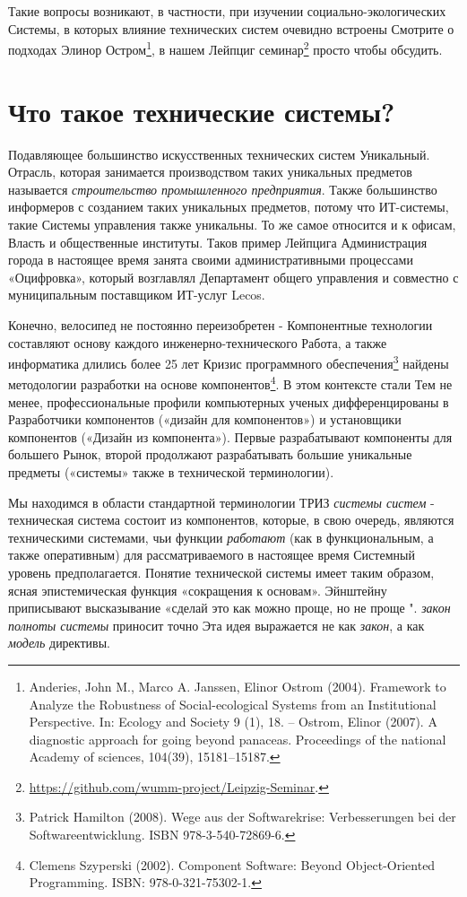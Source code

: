 \documentclass[11pt,a4paper]{article}
\begin{document}
Такие вопросы возникают, в частности, при изучении социально-экологических
Системы, в которых влияние технических систем очевидно встроены Смотрите о
подходах Элинор Остром\footnote{Anderies, John M., Marco A. Janssen, Elinor
  Ostrom (2004).  Framework to Analyze the Robustness of Social-ecological
  Systems from an Institutional Perspective. In: Ecology and Society 9 (1),
  18. -- Ostrom, Elinor (2007). A diagnostic approach for going beyond
  panaceas.  Proceedings of the national Academy of sciences, 104(39),
  15181--15187.}, в нашем Лейпциг
семинар\footnote{\url{https://github.com/wumm-project/Leipzig-Seminar}.}
просто чтобы обсудить.

\section{Что такое технические системы?}

Подавляющее большинство искусственных технических систем Уникальный. Отрасль,
которая занимается производством таких уникальных предметов называется
\emph{строительство промышленного предприятия}. Также большинство информеров с
созданием таких уникальных предметов, потому что ИТ-системы, такие Системы
управления также уникальны. То же самое относится и к офисам, Власть и
общественные институты. Таков пример Лейпцига Администрация города в настоящее
время занята своими административными процессами «Оцифровка», который
возглавлял Департамент общего управления и совместно с муниципальным
поставщиком ИТ-услуг Lecos.

Конечно, велосипед не постоянно переизобретен - Компонентные технологии
составляют основу каждого инженерно-технического Работа, а также информатика
длились более 25 лет Кризис программного обеспечения\footnote{Patrick Hamilton
  (2008). Wege aus der Softwarekrise: Verbesserungen bei der
  Softwareentwicklung. ISBN 978-3-540-72869-6.} найдены методологии разработки
на основе компонентов\footnote{Clemens Szyperski (2002). Component Software:
  Beyond Object-Oriented Programming. ISBN: 978-0-321-75302-1.}.  В этом
контексте стали Тем не менее, профессиональные профили компьютерных ученых
дифференцированы в Разработчики компонентов («дизайн для компонентов») и
установщики компонентов («Дизайн из компонента»). Первые разрабатывают
компоненты для большего Рынок, второй продолжают разрабатывать большие
уникальные предметы («системы» также в технической терминологии).

Мы находимся в области стандартной терминологии ТРИЗ \emph{системы систем} -
техническая система состоит из компонентов, которые, в свою очередь, являются
техническими системами, чьи функции \emph{работают} (как в функциональным, а
также оперативным) для рассматриваемого в настоящее время Системный уровень
предполагается. Понятие технической системы имеет таким образом, ясная
эпистемическая функция «сокращения к основам».  Эйнштейну приписывают
высказывание «сделай это как можно проще, но не проще ". \emph{закон полноты
  системы} приносит точно Эта идея выражается не как \emph{закон}, а как
\emph{модель} директивы.
\end{document}
